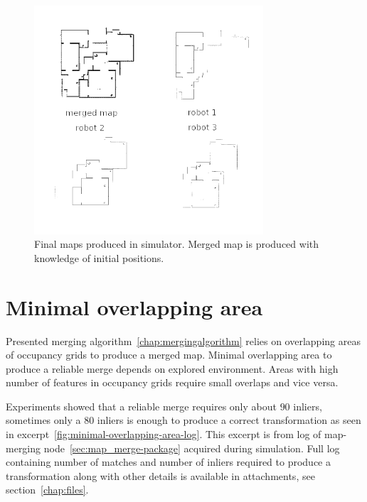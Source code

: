 \begin{figure}
    \centering
    \includegraphics[width=3.35in]{../img/merging-with-known-initial-positions-end.png}
    \caption{Final maps produced in simulator. Merged map is produced with knowledge of initial positions.}
    \label{fig:merging-with-known-initial-positions-end}
\end{figure}

\section{Minimal overlapping area}
\label{sec:minimal-overlaping-area}

Presented merging algorithm~\ref{chap:mergingalgorithm} relies on overlapping areas of occupancy grids to produce a merged map. Minimal overlapping area to produce a reliable merge depends on explored environment. Areas with high number of features in occupancy grids require small overlaps and vice versa.

Experiments showed that a reliable merge requires only about $90$ inliers, sometimes only a $80$ inliers is enough to produce a correct transformation as seen in excerpt~\ref{fig:minimal-overlapping-area-log}. This excerpt is from log of map-merging node~\ref{sec:map_merge-package} acquired during simulation. Full log containing number of matches and number of inliers required to produce a transformation along with other details is available in attachments, see section~\ref{chap:files}.

